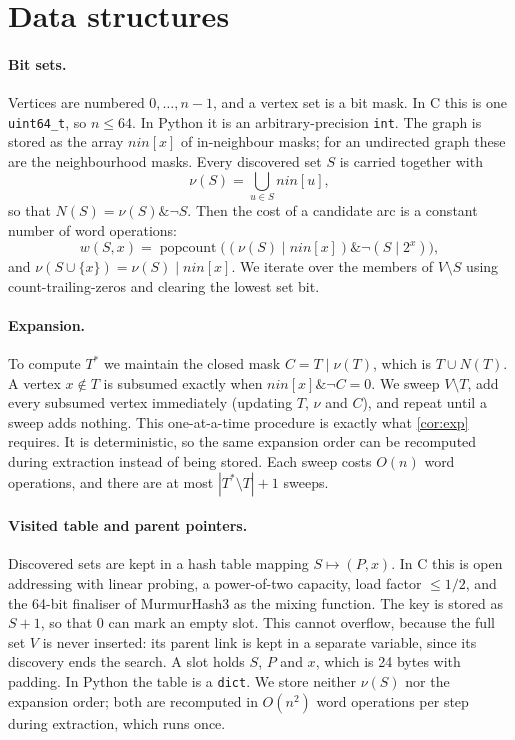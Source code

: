 \documentclass[11pt]{article}
\theoremstyle{definition}
\newcommand{\cost}{w}
\newcommand{\set}[1]{\{#1\}}
\begin{document}
\section{Data structures}\label{sec:ds}

\paragraph{Bit sets.}
Vertices are numbered $0,\dots,n-1$, and a vertex set is a bit mask. In C
this is one \texttt{uint64\_t}, so $n\le 64$. In Python it is an arbitrary-precision
\texttt{int}. The graph is stored as the array $\mathit{nin}[x]$ of
in-neighbour masks; for an undirected graph these are the neighbourhood
masks. Every discovered set $S$ is carried together with
\[
  \nu(S)=\bigcup_{u\in S}\mathit{nin}[u],
\]
so that $N(S)=\nu(S)\mathbin{\&}\lnot S$. Then the cost of a candidate arc
is a constant number of word operations:
\[
  \cost(S,x)=\operatorname{popcount}\bigl((\nu(S)\mid\mathit{nin}[x])\mathbin{\&}\lnot(S\mid 2^x)\bigr),
\]
and $\nu(S\cup\set x)=\nu(S)\mid\mathit{nin}[x]$. We iterate over the
members of $V\setminus S$ using count-trailing-zeros and clearing the lowest
set bit.

\paragraph{Expansion.}
To compute $T^*$ we maintain the closed mask $C=T\mid\nu(T)$, which is
$T\cup N(T)$. A vertex $x\notin T$ is subsumed exactly when
$\mathit{nin}[x]\mathbin{\&}\lnot C=0$. We sweep $V\setminus T$, add every
subsumed vertex immediately (updating $T$, $\nu$ and $C$), and repeat until a
sweep adds nothing. This one-at-a-time procedure is exactly what
\cref{cor:exp} requires. It is deterministic, so the same expansion order
can be recomputed during extraction instead of being stored. Each sweep costs
$O(n)$ word operations, and there are at most $|T^*\setminus T|+1$ sweeps.

\paragraph{Visited table and parent pointers.}
Discovered sets are kept in a hash table mapping $S\mapsto(P,x)$. In C this
is open addressing with linear probing, a power-of-two capacity, load factor
$\le 1/2$, and the 64-bit finaliser of MurmurHash3 as the mixing function.
The key is stored as $S+1$, so that $0$ can mark an empty slot. This cannot
overflow, because the full set $V$ is never inserted: its parent link is
kept in a separate variable, since its discovery ends the search. A slot holds $S$, $P$ and $x$, which is 24 bytes with
padding. In Python the table is a \texttt{dict}. We store neither $\nu(S)$
nor the expansion order; both are recomputed in $O(n^2)$ word operations per
step during extraction, which runs once.
\end{document}
